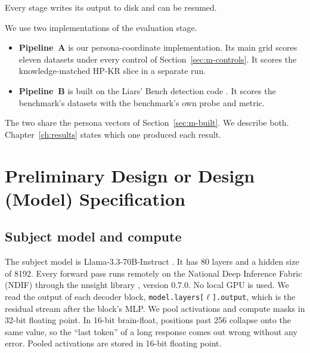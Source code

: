 Every stage writes its output to disk and can be resumed. %

We use two implementations of the evaluation stage.
\begin{itemize}
\item \textbf{Pipeline~A} is our persona-coordinate implementation. Its main grid scores eleven datasets under every control of Section~\ref{sec:m-controls}. It scores the knowledge-matched HP-KR slice in a separate run. %
\item \textbf{Pipeline~B} is built on the Liars' Bench detection code \parencite{kretschmar2025liars,goldowskydill2025detecting}. It scores the benchmark's datasets with the benchmark's own probe and metric.
\end{itemize}
The two share the persona vectors of Section~\ref{sec:m-built}. We describe both. Chapter~\ref{ch:results} states which one produced each result.

\section{Preliminary Design or Design (Model) Specification}
\label{sec:m-spec}

\subsection{Subject model and compute}
\label{sec:m-model}

The subject model is Llama-3.3-70B-Instruct %
\parencite{grattafiori2024llama}. It has 80 layers and a hidden size of 8192. %
Every forward pass runs remotely on the National Deep Inference Fabric (NDIF) through the nnsight library \parencite{fiottokaufman2024nnsight}, version 0.7.0. %
No local GPU is used. We read the output of each decoder block, \texttt{model.layers[$\ell$].output}, which is the residual stream after the block's MLP. %
We pool activations and compute masks in 32-bit floating point. In 16-bit brain-float, positions past 256 collapse onto the same value, so the ``last token'' of a long response comes out wrong without any error. %
Pooled activations are stored in 16-bit floating point. %

